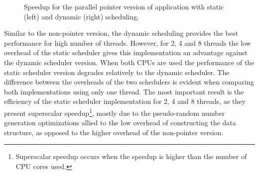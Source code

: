\begin{figure}[!htp]
	\begin{center}
		\caption{Speedup for the parallel pointer version of \tth application with static (left) and dynamic (right) scheduling.}
		\label{fig:PointerSpeedup}
	\end{center}
\end{figure}

Similar to the non-pointer version, the dynamic scheduling provides the best performance for high number of threads. However, for 2, 4 and 8 threads the low overhead of the static scheduler gives this implementation an advantage against the dynamic scheduler version. When both CPUs are used the performance of the static scheduler version degrades relatively to the dynamic scheduler. The difference between the overheads of the two schedulers is evident when comparing both implementations using only one thread. The most important result is the efficiency of the static scheduler implementation for 2, 4 and 8 threads, as they present superscalar speedup\footnote{Superscalar speedup occurs when the speedup is higher than the number of CPU cores used.}, mostly due to the pseudo-random number generation optimizations allied to the low overhead of constructing the data structure, as opposed to the higher overhead of the non-pointer version.

